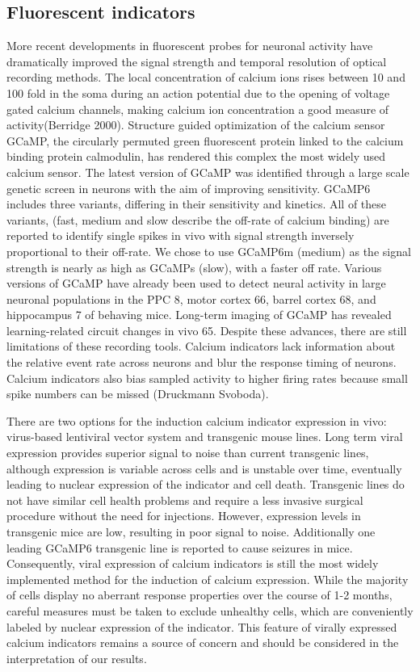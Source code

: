 \subsection{Fluorescent indicators}
More recent developments in fluorescent probes for neuronal activity have dramatically improved the signal strength and temporal resolution of optical recording methods. The local concentration of calcium ions rises between 10 and 100 fold in the soma during an action potential due to the opening of voltage gated calcium channels, making calcium ion concentration a good measure of activity(Berridge 2000). Structure guided optimization of the calcium sensor GCaMP, the circularly permuted green fluorescent protein linked to the calcium binding protein calmodulin, has rendered this complex the most widely used calcium sensor. The latest version of GCaMP was identified through a large scale genetic screen in neurons with the aim of improving sensitivity. GCaMP6 includes three variants, differing in their sensitivity and kinetics. All of these variants, (fast, medium and slow describe the off-rate of calcium binding) are reported to identify single spikes in vivo with signal strength inversely proportional to their off-rate. We chose to use GCaMP6m (medium) as the signal strength is nearly as high as GCaMPs (slow), with a faster off rate.  Various versions of GCaMP have already been used to detect neural activity in large neuronal populations in the PPC 8, motor cortex 66, barrel cortex 68, and hippocampus 7 of behaving mice. Long-term imaging of GCaMP has revealed learning-related circuit changes in vivo 65. Despite these advances, there are still limitations of these recording tools. Calcium indicators lack information about the relative event rate across neurons and blur the response timing of neurons. Calcium indicators also bias sampled activity to higher firing rates because small spike numbers can be missed (Druckmann Svoboda).

\bigskip

There are two options for the induction calcium indicator expression in vivo: virus-based lentiviral vector system and transgenic mouse lines. Long term viral expression provides superior signal to noise than current transgenic lines, although expression is variable across cells and is unstable over time, eventually leading to nuclear expression of the indicator and cell death. Transgenic lines do not have similar cell health problems and require a less invasive surgical procedure without the need for injections. However, expression levels in transgenic mice are low, resulting in poor signal to noise. Additionally one leading GCaMP6 transgenic line is reported to cause seizures in mice. Consequently, viral expression of calcium indicators is still the most widely implemented method for the induction of calcium expression. While the majority of cells display no aberrant response properties over the course of 1-2 months, careful measures must be taken to exclude unhealthy cells, which are conveniently labeled by nuclear expression of the indicator. This feature of virally expressed calcium indicators remains a source of concern and should be considered in the interpretation of our results.

